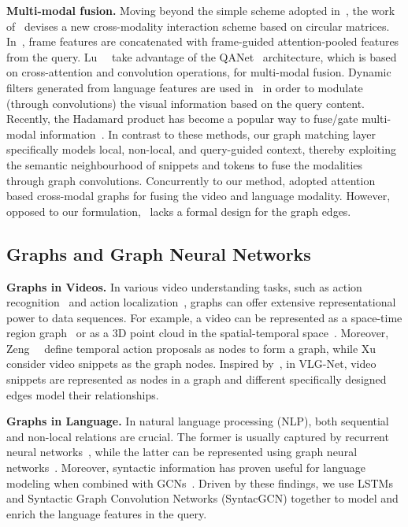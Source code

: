 \documentclass[10pt,twocolumn,letterpaper]{article}
\begin{document}
\noindent \textbf{Multi-modal fusion.}
Moving beyond the simple scheme adopted in~\cite{Gao_2017_ICCV},
the work of~\cite{ijcai2018-143} devises a new cross-modality interaction scheme based on circular matrices. In~\cite{chen_etal_2018_temporally, 10.1145/3240508.3240549, wang2020temporally}, frame features are concatenated with frame-guided attention-pooled features from the query. 
Lu~\etal~\cite{lu_etal_2019_debug} take advantage of the QANet~\cite{YuDLZ00L18} architecture, which is based on cross-attention and convolution operations, for multi-modal fusion. Dynamic filters generated from language features are used in~\cite{Rodriguez_2020_WACV,Zhang_2019_CVPR} in order to modulate (through convolutions) the visual information based on the query content.
Recently, the Hadamard product has become a popular way to fuse/gate multi-modal information~\cite{Mun_2020_CVPR, Zeng_2020_CVPR, 2DTAN_2020_AAAI}.
In contrast to these methods, our graph matching layer specifically models local, non-local, and query-guided context, thereby exploiting the semantic neighbourhood of snippets and tokens to fuse the modalities through graph convolutions. Concurrently to our method, \cite{liu2020jointly} adopted attention based cross-modal graphs for fusing the video and language modality. However, opposed to our formulation,~\cite{liu2020jointly} lacks a formal design for the graph edges.


\subsection{Graphs and Graph Neural Networks}
\noindent \textbf{Graphs in Videos.} In various video understanding tasks, such as action recognition~\cite{chen2019graph, liu2019learning, wang2018videos} and action localization~\cite{Xu_2020_CVPR,zeng2019graph}, graphs can offer extensive representational power to data sequences. For example, a video can be represented as a space-time region graph~\cite{wang2018videos} or as a 3D point cloud in the spatial-temporal space~\cite{liu2019learning}. Moreover, Zeng~\etal~\cite{zeng2019graph} define temporal action proposals as nodes to form a graph, while Xu~\etal~\cite{Xu_2020_CVPR} consider video snippets as the graph nodes. Inspired by~\cite{Xu_2020_CVPR}, in VLG-Net, video snippets are represented as nodes in a graph and different specifically designed edges model their relationships.

\noindent \textbf{Graphs in Language.} 
In natural language processing (NLP), both sequential and non-local relations are crucial. The former is usually captured by recurrent neural networks~\cite{rumelhart1985learning}, while the latter can be represented using graph neural networks~\cite{ bastings2017graph, beck2018graph, marcheggiani2017encoding, 10.1007/978-3-030-00767-6_32}. 
Moreover, syntactic information has proven useful for language modeling when combined with GCNs~\cite{huang2020aligned, lin2020moment, marcheggiani_titov_2017_encoding}. 
Driven by these findings, we use LSTMs and Syntactic Graph Convolution Networks (SyntacGCN) together to model and enrich the language features in the query.
\end{document}
